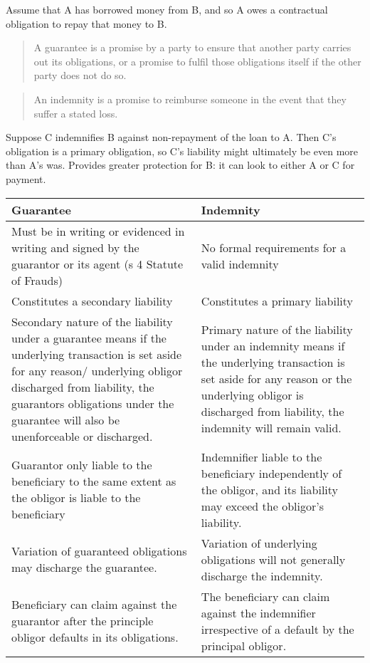 \documentclass[
]{article}
\begin{document}
Assume that A has borrowed money from B, and so A owes a contractual
obligation to repay that money to B.

\begin{quote}
A guarantee is a promise by a party to ensure that another party carries
out its obligations, or a promise to fulfil those obligations itself if
the other party does not do so.
\end{quote}

\begin{quote}
An indemnity is a promise to reimburse someone in the event that they
suffer a stated loss.
\end{quote}

Suppose C indemnifies B against non-repayment of the loan to A. Then C's
obligation is a primary obligation, so C's liability might ultimately be
even more than A's was. Provides greater protection for B: it can look
to either A or C for payment.

\begin{longtable}[]{@{}ll@{}}
\toprule()
Guarantee & Indemnity \\
\midrule()
\endhead
Must be in writing or evidenced in writing and signed by the guarantor
or its agent (s 4 Statute of Frauds) & No formal requirements for a
valid indemnity \\
Constitutes a secondary liability & Constitutes a primary liability \\
Secondary nature of the liability under a guarantee means if the
underlying transaction is set aside for any reason/ underlying obligor
discharged from liability, the guarantors obligations under the
guarantee will also be unenforceable or discharged. & Primary nature of
the liability under an indemnity means if the underlying transaction is
set aside for any reason or the underlying obligor is discharged from
liability, the indemnity will remain valid. \\
Guarantor only liable to the beneficiary to the same extent as the
obligor is liable to the beneficiary & Indemnifier liable to the
beneficiary independently of the obligor, and its liability may exceed
the obligor's liability. \\
Variation of guaranteed obligations may discharge the guarantee. &
Variation of underlying obligations will not generally discharge the
indemnity. \\
Beneficiary can claim against the guarantor after the principle obligor
defaults in its obligations. & The beneficiary can claim against the
indemnifier irrespective of a default by the principal obligor. \\
\bottomrule()
\end{longtable}
\end{document}
